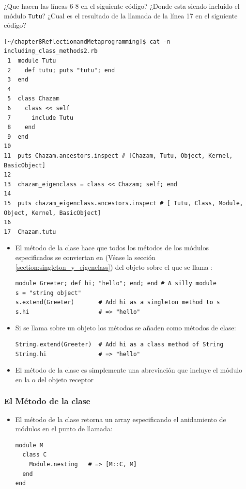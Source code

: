 \begin{exercise}
¿Que hacen las líneas 6-8 en el siguiente código?
¿Donde esta siendo incluído el módulo \verb|Tutu|?
¿Cual es el resultado de la llamada de la línea 17 en el siguiente código?
\begin{verbatim}
[~/chapter8ReflectionandMetaprogramming]$ cat -n including_class_methods2.rb 
 1  module Tutu
 2    def tutu; puts "tutu"; end
 3  end
 4  
 5  class Chazam
 6    class << self
 7      include Tutu
 8    end
 9  end
10  
11  puts Chazam.ancestors.inspect # [Chazam, Tutu, Object, Kernel, BasicObject]
12  
13  chazam_eigenclass = class << Chazam; self; end
14  
15  puts chazam_eigenclass.ancestors.inspect # [ Tutu, Class, Module, Object, Kernel, BasicObject]
16  
17  Chazam.tutu
\end{verbatim}
\end{exercise}

\begin{itemize}
\item
El método  de la clase \Object{} hace que todos los métodos de los módulos 
especificados se conviertan en  
(Véase la sección \ref{section:singleton_y_eigenclass})
del objeto sobre el que se llama :
\begin{verbatim}
module Greeter; def hi; "hello"; end; end # A silly module
s = "string object"
s.extend(Greeter)       # Add hi as a singleton method to s
s.hi                    # => "hello"
\end{verbatim}
\item 
Si  se llama sobre un objeto \Class{} los métodos se añaden como 
métodos de clase:
\begin{verbatim}
String.extend(Greeter)  # Add hi as a class method of String
String.hi               # => "hello"
\end{verbatim}
\item
El método  de la clase \Object{} 
es simplemente una abreviación que incluye el módulo
en la  o  del objeto receptor
\end{itemize}

\subsubsection{El Método  de la clase \Module{}}
\begin{itemize}
\item
El método  de la clase \Module{} retorna un array especificando el anidamiento
de módulos en el punto de llamada:
\begin{verbatim}
module M
  class C
    Module.nesting   # => [M::C, M]
  end
end
\end{verbatim}
\end{itemize}


